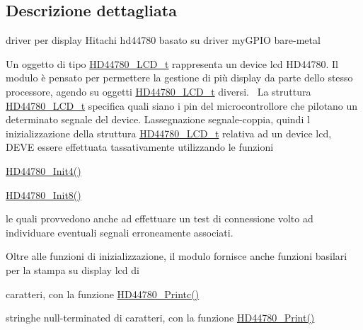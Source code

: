 \subsection{Descrizione dettagliata}
driver per display Hitachi hd44780 basato su driver my\+G\+P\+IO bare-\/metal 

Un oggetto di tipo \hyperlink{struct_h_d44780___l_c_d__t}{H\+D44780\+\_\+\+L\+C\+D\+\_\+t} rappresenta un device lcd H\+D44780. Il modulo è pensato per permettere la gestione di più display da parte dello stesso processore, agendo su oggetti \hyperlink{struct_h_d44780___l_c_d__t}{H\+D44780\+\_\+\+L\+C\+D\+\_\+t} diversi.~\newline
 La struttura \hyperlink{struct_h_d44780___l_c_d__t}{H\+D44780\+\_\+\+L\+C\+D\+\_\+t} specifica quali siano i pin del microcontrollore che pilotano un determinato segnale del device. L\textquotesingle{}assegnazione segnale-\/coppia, quindi l\textquotesingle{} inizializzazione della struttura \hyperlink{struct_h_d44780___l_c_d__t}{H\+D44780\+\_\+\+L\+C\+D\+\_\+t} relativa ad un device lcd, D\+E\+VE essere effettuata tassativamente utilizzando le funzioni~\newline

\begin{DoxyItemize}
\item \hyperlink{group___h_d44780_ga0c08f9e41d770ebfa4af385a56b47b81}{H\+D44780\+\_\+\+Init4()}
\item \hyperlink{group___h_d44780_gad212907e20316f4fc0e93d7c7a8f338e}{H\+D44780\+\_\+\+Init8()}~\newline

\end{DoxyItemize}

le quali provvedono anche ad effettuare un test di connessione volto ad individuare eventuali segnali erroneamente associati.~\newline


Oltre alle funzioni di inizializzazione, il modulo fornisce anche funzioni basilari per la stampa su display lcd di
\begin{DoxyItemize}
\item caratteri, con la funzione \hyperlink{group___h_d44780_ga57b8c6ca0b3c12e5f7273b3c373a6f17}{H\+D44780\+\_\+\+Printc()}
\item stringhe null-\/terminated di caratteri, con la funzione \hyperlink{group___h_d44780_ga3aedff8e2040e62db569fde955d3987b}{H\+D44780\+\_\+\+Print()}~\newline

\end{DoxyItemize}

